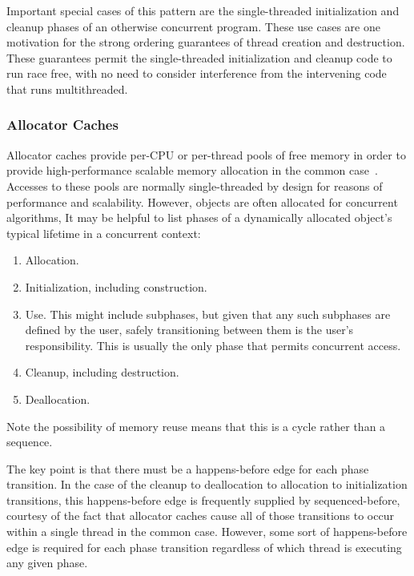 \documentclass[10]{article}
\begin{document}
Important special cases of this pattern are the single-threaded
initialization and cleanup phases of an otherwise concurrent program.
These use cases are one motivation for the strong ordering guarantees
of thread creation and destruction.
These guarantees permit the single-threaded initialization and cleanup
code to run race free, with no need to consider interference from the
intervening code that runs multithreaded.

\subsubsection{Allocator Caches}
\label{sec:Allocator Caches}

Allocator caches provide per-CPU or per-thread pools of free memory
in order to provide high-performance scalable memory allocation in
the common case~\cite{McKenney93,Bonwick94slab}.
Accesses to these pools are normally single-threaded by design for
reasons of performance and scalability.
However, objects are often allocated for concurrent algorithms,
It may be helpful to list phases of a dynamically allocated object's
typical lifetime in a concurrent context:

\begin{enumerate}
\item	Allocation.
\item	Initialization, including construction.
\item	Use.
	This might include subphases, but given that any such
	subphases are defined by the user, safely transitioning between
	them is the user's responsibility.
	This is usually the only phase that permits concurrent access.
\item	Cleanup, including destruction.
\item	Deallocation.
\end{enumerate}

Note the possibility of memory reuse means that this is a cycle rather
than a sequence.

The key point is that there must be a happens-before edge for each
phase transition.
In the case of the cleanup to deallocation to allocation to initialization
transitions, this happens-before edge is frequently supplied by
sequenced-before, courtesy of the fact that allocator caches cause
all of those transitions to occur within a single thread in the common
case.
However, some sort of happens-before edge is required for each phase
transition regardless of which thread is executing any given phase.
\end{document}
